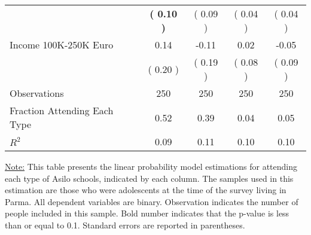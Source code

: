 \begin{table}[H]
{\begin{tabular}{lcccc}
\quad  & \textbf{(     0.10 )} & (     0.09 )  & (     0.04 )  & (     0.04 )  \\
\quad Income 100K-250K Euro &      0.14 &     -0.11 &      0.02 &     -0.05 \\
\quad  & (     0.20 ) & (     0.19 )  & (     0.08 )  & (     0.09 )  \\
\midrule
Observations & 250 & 250 & 250 & 250 \\
Fraction Attending Each Type &      0.52 &      0.39 &      0.04 &      0.05 \\
\midrule
$ R^2$ &      0.09 &      0.11 &      0.10 &      0.10 \\
\bottomrule
\end{tabular}}
\end{table}
\begin{scriptsize}
\noindent\underline{Note:} This table presents the linear probability model estimations for attending each type of Asilo schools, indicated by each column. The samples used in this estimation are those who were adolescents at the time of the survey living in Parma. All dependent variables are binary. Observation indicates the number of people included in this sample. Bold number indicates that the p-value is less than or equal to 0.1. Standard errors are reported in parentheses.
\end{scriptsize}
